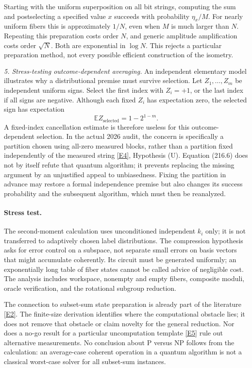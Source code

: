 \documentclass[11pt,a4paper]{article}
\newcommand{\E}{\mathbb{E}}
\newcommand{\eref}[2]{\hyperlink{extra:#1:#2}{[E#2]}}
\begin{document}
Starting with the uniform superposition on all bit strings, computing
the sum and postselecting a specified value $x$ succeeds with probability
$\eta_x/M$. For nearly uniform fibers this is approximately $1/N$, even
when $M$ is much larger than $N$. Repeating this preparation costs order
$N$, and generic amplitude amplification costs order $\sqrt N$.
Both are exponential in $\log N$. This rejects a particular preparation
method, not every possible efficient construction of the isometry.

\textit{5. Stress-testing outcome-dependent averaging.}
An independent elementary model illustrates why a distributional premise
must survive selection. Let $Z_1,\ldots,Z_m$ be independent uniform signs.
Select the first index with $Z_i=+1$, or the last index if all signs are
negative. Although each fixed $Z_i$ has expectation zero, the selected
sign has expectation
\[
 \E Z_{\mathrm{selected}}=1-2^{1-m}.                       \tag{216.6}
\]
A fixed-index cancellation estimate is therefore useless for this
outcome-dependent selection. In the actual 2026 audit, the concern is
specifically a partition chosen using all-zero measured blocks, rather
than a partition fixed independently of the measured string
\eref{216}{4}, Hypothesis (U). Equation (216.6) does not by itself refute
that quantum algorithm; it prevents replacing the missing argument by an
unjustified appeal to unbiasedness. Fixing the partition in advance may
restore a formal independence premise but also changes its success
probability and the subsequent algorithm, which must then be reanalyzed.

\paragraph{Stress test.}
The second-moment calculation uses unconditioned independent $k_i$ only;
it is not transferred to adaptively chosen label distributions. The
compression hypothesis asks for error control on a subspace, not separate
small errors on basis vectors that might accumulate coherently. Its circuit
must be generated uniformly; an exponentially long table of fiber states
cannot be called advice of negligible cost. The analysis includes workspace,
nonempty and empty fibers, composite moduli, oracle verification, and the
rotational subgroup reduction.

The connection to subset-sum state preparation is already part of the
literature \eref{216}{2}. The finite-size derivation identifies where the
computational obstacle lies; it does not remove that obstacle or claim
novelty for the general reduction. Nor does a no-go result for a particular
uncomputation template \eref{216}{5} rule out alternative measurements.
No conclusion about $\mathrm P$ versus $\mathrm{NP}$ follows from the
calculation: an average-case coherent operation in a quantum algorithm is
not a classical worst-case solver for all subset-sum instances.
\end{document}
